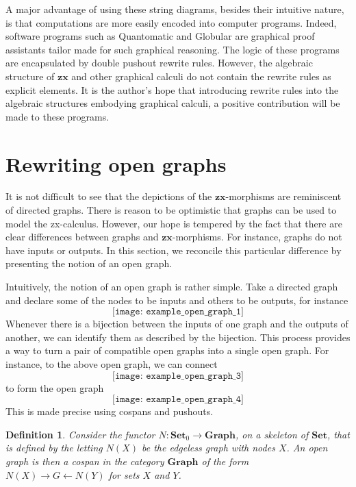 \documentclass[]{amsart}
\theoremstyle{defn}
\newtheorem{defn}[thm]{Definition}
\begin{document}
A major advantage of using these string diagrams, besides their intuitive nature, is that computations are more easily encoded into computer programs.  Indeed, software programs such as Quantomatic \cite{BarKissingerVicary_Globular,DixonDuncanKissinger_QuantomaticWebsite} and Globular \cite{BarKissingerVicary_Globular} are graphical proof assistants tailor made for such graphical reasoning.  The logic of these programs are encapsulated by double pushout rewrite rules.  However, the algebraic structure of $\mathbf{zx}$ and other graphical calculi do not contain the rewrite rules as explicit elements.  It is the author's hope that introducing rewrite rules into the algebraic structures embodying graphical calculi, a positive contribution will be made to these programs.  

\section{Rewriting open graphs}
\label{sec:RewritingOpenGraphs}

It is not difficult to see that the depictions of the $\mathbf{zx}$-morphisms are reminiscent of directed graphs.  There is reason to be optimistic that graphs can be used to model the zx-calculus.  However, our hope is tempered by the fact that there are clear differences between graphs and $\mathbf{zx}$-morphisms.  For instance, graphs do not have inputs or outputs. In this section, we reconcile this particular difference by presenting the notion of an open graph.

Intuitively, the notion of an open graph is rather simple.  Take a directed graph and declare some of the nodes to be inputs and others to be outputs, for instance
\[
\texttt{[image: example\_open\_graph\_1]}
\]
Whenever there is a bijection between the inputs of one graph and the outputs of another, we can identify them as described by the bijection.  This process provides a way to turn a pair of compatible open graphs into a single open graph.  For instance, to the above open graph, we can connect 
\[
\texttt{[image: example\_open\_graph\_3]}
\]
to form the open graph
\[
\texttt{[image: example\_open\_graph\_4]}
\]
This is made precise using cospans and pushouts. 

\begin{defn}
	\label{def:Open Graph}
	Consider the functor $N \colon \mathbf{Set}_0 \to \mathbf{Graph}$, on a skeleton of $\mathbf{Set}$, that is defined by the letting $N(X)$ be the edgeless graph with nodes $X$.  An \emph{open graph} is then a cospan in the category $\mathbf{Graph}$ of the form $N(X) \to G \gets N(Y)$ for sets $X$ and $Y$.
\end{defn}
\end{document}
